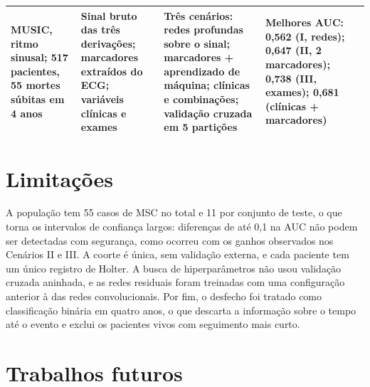 \begin{quadro}[h!]
{\begin{tabular}{|p{2.3cm}|p{2.6cm}|p{2.9cm}|p{2.9cm}|p{3.1cm}|}
			MUSIC, ritmo sinusal; 517 pacientes, 55 mortes súbitas em 4 anos                                 &
			Sinal bruto das três derivações; marcadores extraídos do \gls{ECG}; variáveis clínicas e exames &
			Três cenários: redes profundas sobre o sinal; marcadores + aprendizado de máquina; clínicas e combinações; validação cruzada em 5 partições &
			Melhores \gls{AUC}: 0,562 (I, redes); 0,647 (II, 2 marcadores); 0,738 (III, exames); 0,681 (clínicas + marcadores)                                                                                                       \\
			\hline
		\end{tabular}
	}{
	}
\end{quadro}

\section{Limitações}
\label{sec:conc-limitacoes}

A população tem 55 casos de \gls{MSC} no total e 11 por conjunto de teste,
o que torna os intervalos de confiança largos: diferenças de até 0,1 na
\gls{AUC} não podem ser detectadas com segurança, como ocorreu com os ganhos
observados nos Cenários II e III. A coorte é única, sem validação externa, e
cada paciente tem um único registro de Holter. A busca de hiperparâmetros
não usou validação cruzada aninhada, e as redes residuais foram treinadas
com uma configuração anterior à das redes convolucionais. Por fim, o
desfecho foi tratado como classificação binária em quatro anos, o que
descarta a informação sobre o tempo até o evento e exclui os pacientes
vivos com seguimento mais curto.

\section{Trabalhos futuros}
\label{sec:conc-futuros}


